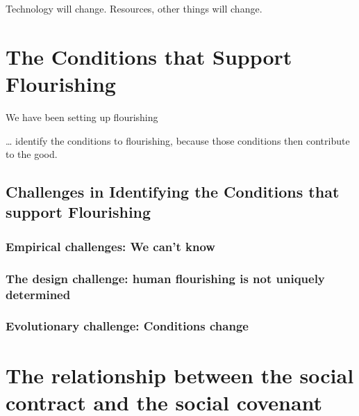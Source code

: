 \documentclass[
]{book}
\begin{document}
Technology will change. Resources, other things will change.

\hypertarget{the-conditions-that-support-flourishing}{%
\chapter{The Conditions that Support Flourishing}\label{the-conditions-that-support-flourishing}}

We have been setting up flourishing

\ldots{} identify the conditions to flourishing, because those conditions then contribute to the good.

\hypertarget{challenges-in-identifying-the-conditions-that-support-flourishing}{%
\section{Challenges in Identifying the Conditions that support Flourishing}\label{challenges-in-identifying-the-conditions-that-support-flourishing}}

\hypertarget{empirical-challenges-we-cant-know}{%
\subsection{Empirical challenges: We can't know}\label{empirical-challenges-we-cant-know}}

\hypertarget{the-design-challenge-human-flourishing-is-not-uniquely-determined}{%
\subsection{The design challenge: human flourishing is not uniquely determined}\label{the-design-challenge-human-flourishing-is-not-uniquely-determined}}

\hypertarget{evolutionary-challenge-conditions-change}{%
\subsection{Evolutionary challenge: Conditions change}\label{evolutionary-challenge-conditions-change}}

\hypertarget{the-relationship-between-the-social-contract-and-the-social-covenant}{%
\chapter{The relationship between the social contract and the social covenant}\label{the-relationship-between-the-social-contract-and-the-social-covenant}}
\end{document}

